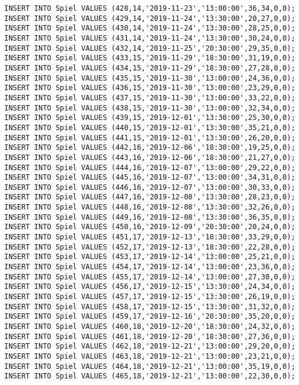 \documentclass{bschlangaul-aufgabe}
\begin{document}
\begin{verbatim}
INSERT INTO Spiel VALUES (428,14,'2019-11-23','13:00:00',36,34,0,0);
INSERT INTO Spiel VALUES (429,14,'2019-11-24','13:30:00',20,27,0,0);
INSERT INTO Spiel VALUES (430,14,'2019-11-24','13:30:00',28,25,0,0);
INSERT INTO Spiel VALUES (431,14,'2019-11-24','13:30:00',30,24,0,0);
INSERT INTO Spiel VALUES (432,14,'2019-11-25','20:30:00',29,35,0,0);
INSERT INTO Spiel VALUES (433,15,'2019-11-29','18:30:00',31,19,0,0);
INSERT INTO Spiel VALUES (434,15,'2019-11-29','18:30:00',27,28,0,0);
INSERT INTO Spiel VALUES (435,15,'2019-11-30','13:00:00',24,36,0,0);
INSERT INTO Spiel VALUES (436,15,'2019-11-30','13:00:00',23,29,0,0);
INSERT INTO Spiel VALUES (437,15,'2019-11-30','13:00:00',33,22,0,0);
INSERT INTO Spiel VALUES (438,15,'2019-11-30','13:00:00',32,34,0,0);
INSERT INTO Spiel VALUES (439,15,'2019-12-01','13:30:00',25,30,0,0);
INSERT INTO Spiel VALUES (440,15,'2019-12-01','13:30:00',35,21,0,0);
INSERT INTO Spiel VALUES (441,15,'2019-12-01','13:30:00',26,20,0,0);
INSERT INTO Spiel VALUES (442,16,'2019-12-06','18:30:00',19,25,0,0);
INSERT INTO Spiel VALUES (443,16,'2019-12-06','18:30:00',21,27,0,0);
INSERT INTO Spiel VALUES (444,16,'2019-12-07','13:00:00',29,22,0,0);
INSERT INTO Spiel VALUES (445,16,'2019-12-07','13:00:00',34,31,0,0);
INSERT INTO Spiel VALUES (446,16,'2019-12-07','13:00:00',30,33,0,0);
INSERT INTO Spiel VALUES (447,16,'2019-12-08','13:30:00',28,23,0,0);
INSERT INTO Spiel VALUES (448,16,'2019-12-08','13:30:00',32,26,0,0);
INSERT INTO Spiel VALUES (449,16,'2019-12-08','13:30:00',36,35,0,0);
INSERT INTO Spiel VALUES (450,16,'2019-12-09','20:30:00',20,24,0,0);
INSERT INTO Spiel VALUES (451,17,'2019-12-13','18:30:00',33,29,0,0);
INSERT INTO Spiel VALUES (452,17,'2019-12-13','18:30:00',22,28,0,0);
INSERT INTO Spiel VALUES (453,17,'2019-12-14','13:00:00',25,21,0,0);
INSERT INTO Spiel VALUES (454,17,'2019-12-14','13:00:00',23,36,0,0);
INSERT INTO Spiel VALUES (455,17,'2019-12-14','13:00:00',27,30,0,0);
INSERT INTO Spiel VALUES (456,17,'2019-12-15','13:30:00',24,34,0,0);
INSERT INTO Spiel VALUES (457,17,'2019-12-15','13:30:00',26,19,0,0);
INSERT INTO Spiel VALUES (458,17,'2019-12-15','13:30:00',31,32,0,0);
INSERT INTO Spiel VALUES (459,17,'2019-12-16','20:30:00',35,20,0,0);
INSERT INTO Spiel VALUES (460,18,'2019-12-20','18:30:00',24,32,0,0);
INSERT INTO Spiel VALUES (461,18,'2019-12-20','18:30:00',27,36,0,0);
INSERT INTO Spiel VALUES (462,18,'2019-12-21','13:00:00',29,20,0,0);
INSERT INTO Spiel VALUES (463,18,'2019-12-21','13:00:00',23,21,0,0);
INSERT INTO Spiel VALUES (464,18,'2019-12-21','13:00:00',35,19,0,0);
INSERT INTO Spiel VALUES (465,18,'2019-12-21','13:00:00',22,30,0,0);

\end{verbatim}
\end{document}
